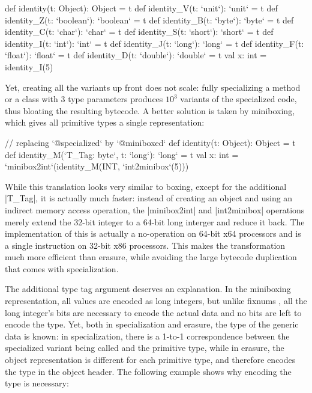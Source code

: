 \begin{lstlisting-nobreak}
 def identity(t: Object): Object = t
 def identity_V(t: `unit`): `unit` = t
 def identity_Z(t: `boolean`): `boolean` = t
 def identity_B(t: `byte`): `byte` = t
 def identity_C(t: `char`): `char` = t
 def identity_S(t: `short`): `short` = t
 def identity_I(t: `int`): `int` = t
 def identity_J(t: `long`): `long` = t
 def identity_F(t: `float`): `float` = t
 def identity_D(t: `double`): `double` = t
 val x: int = identity_I(5)
\end{lstlisting-nobreak}

Yet, creating all the variants up front does not scale: fully specializing a method or a class with 3 type parameters produces $10^3$ variants of the specialized code, thus bloating the resulting bytecode. A better solution is taken by miniboxing, which gives all primitive types a single representation:

\begin{lstlisting-nobreak}
 // replacing `@specialized` by `@miniboxed`
 def identity(t: Object): Object = t
 def identity_M(`T_Tag: byte`, t: `long`): `long` = t
 val x: int =
     `minibox2int`(identity_M(INT, `int2minibox`(5)))
\end{lstlisting-nobreak}

While this translation looks very similar to boxing, except for the additional |T_Tag|, it is actually much faster: instead of creating an object and using an indirect memory access operation, the |minibox2int| and |int2minibox| operations merely extend the 32-bit integer to a 64-bit long interger and reduce it back. The implementation of this is actually a no-operation on 64-bit x64 processors and is a single instruction on 32-bit x86 processors. This makes the transformation much more efficient than erasure, while avoiding the large bytecode duplication that comes with specialization.

The additional type tag argument deserves an explanation. In the miniboxing representation, all values are encoded as long integers, but unlike fixnums \cite{fixnums-lisp}, all the long integer's bits are necessary to encode the actual data and no bits are left to encode the type. Yet, both in specialization and erasure, the type of the generic data is known: in specialization, there is a 1-to-1 correspondence between the specialized variant being called and the primitive type, while in erasure, the object representation is different for each primitive type, and therefore encodes the type in the object header. The following example shows why encoding the type is necessary:

